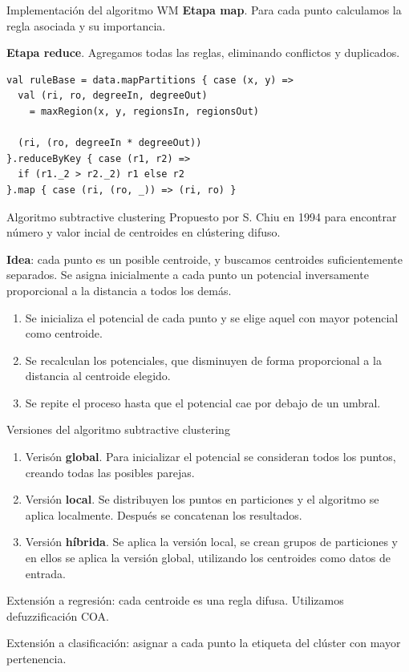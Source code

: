 \documentclass[10pt, spanish]{beamer}
\begin{document}
\begin{frame}[fragile]{Implementación del algoritmo WM}
  \textbf{Etapa map}. Para cada punto calculamos la regla asociada y su importancia.

  \textbf{Etapa reduce}. Agregamos todas las reglas, eliminando conflictos y duplicados.

  \vspace{1em}

  \begin{lstlisting}
val ruleBase = data.mapPartitions { case (x, y) =>
  val (ri, ro, degreeIn, degreeOut)
    = maxRegion(x, y, regionsIn, regionsOut)

  (ri, (ro, degreeIn * degreeOut))
}.reduceByKey { case (r1, r2) =>
  if (r1._2 > r2._2) r1 else r2
}.map { case (ri, (ro, _)) => (ri, ro) }
  \end{lstlisting}
\end{frame}


\begin{frame}{Algoritmo subtractive clustering}
  Propuesto por S. Chiu en 1994 para encontrar número y valor incial de centroides en clústering difuso.

  \textbf{Idea}: cada punto es un posible centroide, y buscamos centroides suficientemente separados. Se asigna inicialmente a cada punto un potencial inversamente proporcional a la distancia a todos los demás.

  \pause
  \begin{enumerate}[<+->]
    \item Se inicializa el potencial de cada punto y se elige aquel con mayor potencial como centroide.
    \item Se recalculan los potenciales, que disminuyen de forma proporcional a la distancia al centroide elegido.
    \item Se repite el proceso hasta que el potencial cae por debajo de un umbral.
  \end{enumerate}
\end{frame}

\begin{frame}{Versiones del algoritmo subtractive clustering}
  \begin{enumerate}
    \item Verisón \textbf{global}. Para inicializar el potencial se consideran todos los puntos, creando todas las posibles parejas.
    \item Versión \textbf{local}. Se distribuyen los puntos en particiones y el algoritmo se aplica localmente. Después se concatenan los resultados.
    \item Versión \textbf{híbrida}. Se aplica la versión local, se crean grupos de particiones y en ellos se aplica la versión global, utilizando los centroides como datos de entrada.
  \end{enumerate}

  \pause

  Extensión a regresión: cada centroide es una regla difusa. Utilizamos defuzzificación COA.

  Extensión a clasificación: asignar a cada punto la etiqueta del clúster con mayor pertenencia.
\end{frame}
\end{document}
